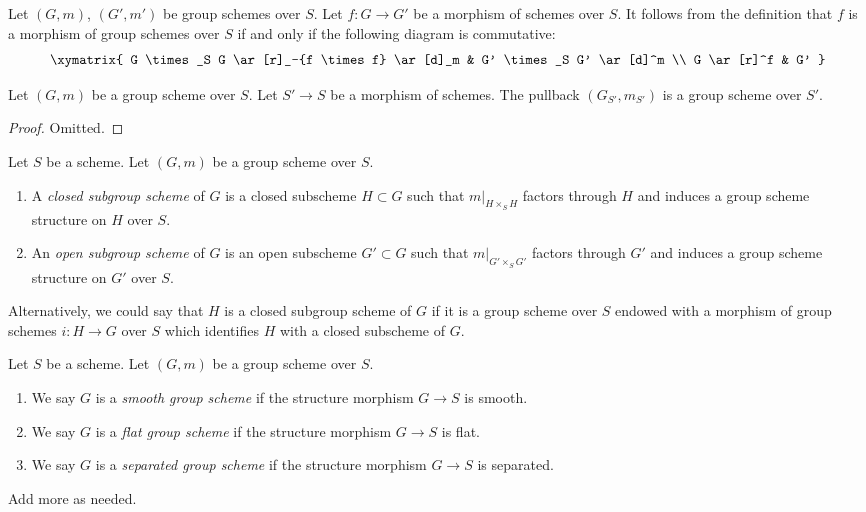 \medskip\noindent
Let $(G, m)$, $(G', m')$ be group schemes over $S$.
Let $f : G \to G'$ be a morphism of schemes over $S$.
It follows from the definition that $f$ is a morphism
of group schemes over $S$ if and only if the following diagram
is commutative:
$$
\xymatrix{
G \times_S G \ar[r]_-{f \times f} \ar[d]_m &
G' \times_S G' \ar[d]^m \\
G \ar[r]^f & G'
}
$$

\begin{lemma}
\label{lemma-base-change-group-scheme}
Let $(G, m)$ be a group scheme over $S$.
Let $S' \to S$ be a morphism of schemes.
The pullback $(G_{S'}, m_{S'})$ is a group scheme over $S'$.
\end{lemma}

\begin{proof}
Omitted.
\end{proof}

\begin{definition}
\label{definition-closed-subgroup-scheme}
Let $S$ be a scheme. Let $(G, m)$ be a group scheme over $S$.
\begin{enumerate}
\item A {\it closed subgroup scheme} of $G$ is a closed subscheme
$H \subset G$ such that $m|_{H \times_S H}$ factors through $H$ and induces a
group scheme structure on $H$ over $S$.
\item An {\it open subgroup scheme} of $G$ is an open subscheme
$G' \subset G$ such that $m|_{G' \times_S G'}$ factors through $G'$
and induces a group scheme structure on $G'$ over $S$.
\end{enumerate}
\end{definition}

\noindent
Alternatively, we could say that $H$ is a closed subgroup scheme of $G$
if it is a group scheme over $S$ endowed with a morphism of group schemes
$i : H \to G$ over $S$ which identifies $H$ with a closed subscheme of $G$.

\begin{definition}
\label{definition-smooth-group-scheme}
Let $S$ be a scheme. Let $(G, m)$ be a group scheme over $S$.
\begin{enumerate}
\item We say $G$ is a {\it smooth group scheme} if the structure
morphism $G \to S$ is smooth.
\item We say $G$ is a {\it flat group scheme} if the structure
morphism $G \to S$ is flat.
\item We say $G$ is a {\it separated group scheme} if the structure
morphism $G \to S$ is separated.
\end{enumerate}
Add more as needed.
\end{definition}






